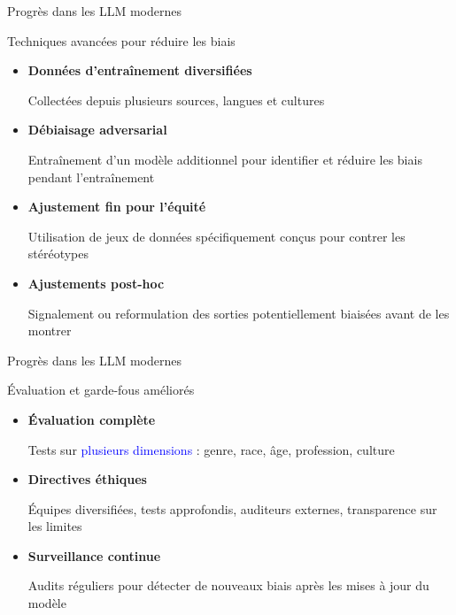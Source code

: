 \begin{frame}{Progrès dans les LLM modernes}

    \begin{block}{Techniques avancées pour réduire les biais}
        \medskip
        \begin{itemize}
            \item<+-> \textbf{Données d'entraînement diversifiées}

            Collectées depuis plusieurs sources, langues et cultures

            \item<+-> \textbf{Débiaisage adversarial}

            Entraînement d'un modèle additionnel pour identifier et réduire les biais pendant l'entraînement

            \item<+-> \textbf{Ajustement fin pour l'équité}

            Utilisation de jeux de données spécifiquement conçus pour contrer les stéréotypes

            \item<+-> \textbf{Ajustements post-hoc}

            Signalement ou reformulation des sorties potentiellement biaisées avant de les montrer
        \end{itemize}
    \end{block}

\end{frame}


\begin{frame}{Progrès dans les LLM modernes}

    \begin{block}{Évaluation et garde-fous améliorés}
        \medskip
        \begin{itemize}
            \item<+-> \textbf{Évaluation complète}

            Tests sur \textcolor{blue}{plusieurs dimensions} : genre, race, âge, profession, culture

            \item<+-> \textbf{Directives éthiques}

            Équipes diversifiées, tests approfondis, auditeurs externes, transparence sur les limites

            \item<+-> \textbf{Surveillance continue}

            Audits réguliers pour détecter de nouveaux biais après les mises à jour du modèle
        \end{itemize}
    \end{block}

\end{frame}



